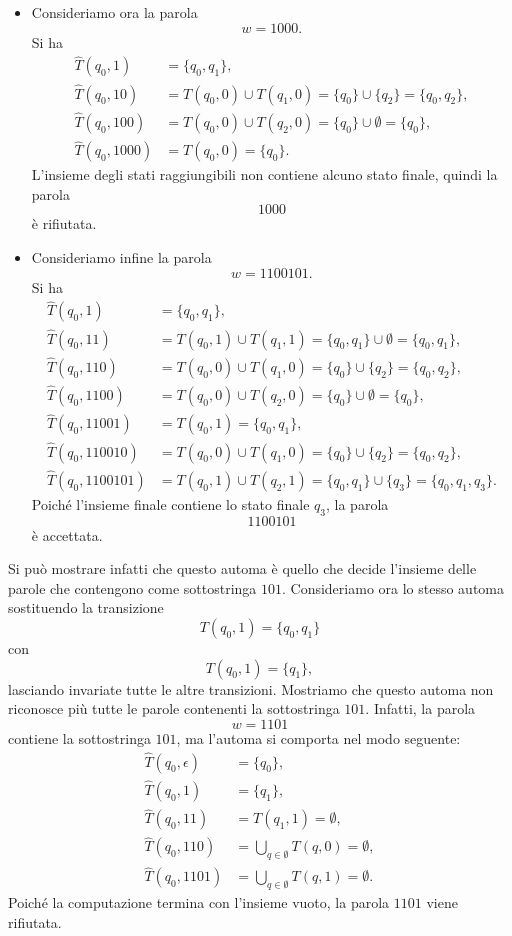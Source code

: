 \begin{exam}
\begin{itemize}
    \item Consideriamo ora la parola
    \[
    w=1000.
    \]
    Si ha
    \[
    \begin{aligned}
    \widehat{T}(q_0,1)&=\{q_0,q_1\},\\
    \widehat{T}(q_0,10)
        &=T(q_0,0)\cup T(q_1,0)
        =\{q_0\}\cup\{q_2\}
        =\{q_0,q_2\},\\
    \widehat{T}(q_0,100)
        &=T(q_0,0)\cup T(q_2,0)
        =\{q_0\}\cup\emptyset
        =\{q_0\},\\
    \widehat{T}(q_0,1000)
        &=T(q_0,0)
        =\{q_0\}.
    \end{aligned}
    \]
    L'insieme degli stati raggiungibili non contiene alcuno stato finale, quindi la parola
    \[
    1000
    \]
    è rifiutata.
    \item Consideriamo infine la parola
\[
w=1100101.
\]
Si ha
\[
\begin{aligned}
\widehat{T}(q_0,1)&=\{q_0,q_1\},\\
\widehat{T}(q_0,11)
    &=T(q_0,1)\cup T(q_1,1)
    =\{q_0,q_1\}\cup\emptyset
    =\{q_0,q_1\},\\
\widehat{T}(q_0,110)
    &=T(q_0,0)\cup T(q_1,0)
    =\{q_0\}\cup\{q_2\}
    =\{q_0,q_2\},\\
\widehat{T}(q_0,1100)
    &=T(q_0,0)\cup T(q_2,0)
    =\{q_0\}\cup\emptyset
    =\{q_0\},\\
\widehat{T}(q_0,11001)
    &=T(q_0,1)
    =\{q_0,q_1\},\\
\widehat{T}(q_0,110010)
    &=T(q_0,0)\cup T(q_1,0)
    =\{q_0\}\cup\{q_2\}
    =\{q_0,q_2\},\\
\widehat{T}(q_0,1100101)
    &=T(q_0,1)\cup T(q_2,1)
    =\{q_0,q_1\}\cup\{q_3\}
    =\{q_0,q_1,q_3\}.
\end{aligned}
\]
Poiché l'insieme finale contiene lo stato finale $q_3$, la parola
\[
1100101
\]
è accettata.
\end{itemize}
Si può mostrare infatti che questo automa è quello che decide l'insieme delle parole che contengono come sottostringa $101$.
Consideriamo ora lo stesso automa sostituendo la transizione
\[
T(q_0,1)=\{q_0,q_1\}
\]
con
\[
T(q_0,1)=\{q_1\},
\]
lasciando invariate tutte le altre transizioni.
Mostriamo che questo automa non riconosce più tutte le parole contenenti la sottostringa \(101\).
Infatti, la parola
\[
w=1101
\]
contiene la sottostringa \(101\), ma l'automa si comporta nel modo seguente:
\[
\begin{aligned}
\widehat{T}(q_0,\epsilon)&=\{q_0\},\\
\widehat{T}(q_0,1)&=\{q_1\},\\
\widehat{T}(q_0,11)&=T(q_1,1)=\emptyset,\\
\widehat{T}(q_0,110)&=\bigcup_{q\in\emptyset}T(q,0)=\emptyset,\\
\widehat{T}(q_0,1101)&=\bigcup_{q\in\emptyset}T(q,1)=\emptyset.
\end{aligned}
\]
Poiché la computazione termina con l'insieme vuoto, la parola \(1101\) viene rifiutata.


\end{exam}
